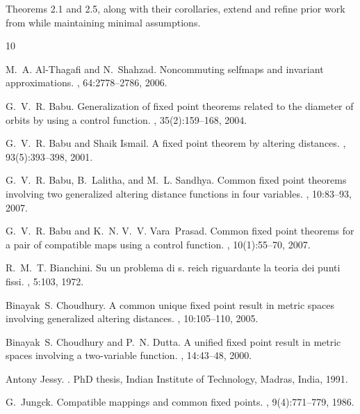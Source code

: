 \documentclass[11]{article}
\numberwithin{equation}{section}
\begin{document}
Theorems 2.1 and 2.5, along with their corollaries, extend and refine prior work from \cite{AlThagafi2006, Jungck1986, Jungck1994, Murthy1998, Pant1994, Zhang2008} while maintaining minimal assumptions. 

\begin{thebibliography}{10}

M.~A. Al-Thagafi and N.~Shahzad.
\newblock Noncommuting selfmaps and invariant approximations.
, 64:2778--2786, 2006.

G.~V.~R. Babu.
\newblock Generalization of fixed point theorems related to the diameter of orbits by using a control function.
, 35(2):159--168, 2004.

G.~V.~R. Babu and Shaik Ismail.
\newblock A fixed point theorem by altering distances.
, 93(5):393--398, 2001.

G.~V.~R. Babu, B.~Lalitha, and M.~L. Sandhya.
\newblock Common fixed point theorems involving two generalized altering distance functions in four variables.
, 10:83--93, 2007.

G.~V.~R. Babu and K.~N. V.~V. Vara~Prasad.
\newblock Common fixed point theorems for a pair of compatible maps using a control function.
, 10(1):55--70, 2007.

R.~M.~T. Bianchini.
\newblock Su un problema di s. reich riguardante la teoria dei punti fissi.
, 5:103, 1972.

Binayak~S. Choudhury.
\newblock A common unique fixed point result in metric spaces involving generalized altering distances.
, 10:105--110, 2005.

Binayak~S. Choudhury and P.~N. Dutta.
\newblock A unified fixed point result in metric spaces involving a two-variable function.
, 14:43--48, 2000.

Antony Jessy.
.
\newblock PhD thesis, Indian Institute of Technology, Madras, India, 1991.

G.~Jungck.
\newblock Compatible mappings and common fixed points.
, 9(4):771--779, 1986.


\end{thebibliography}
\end{document}
